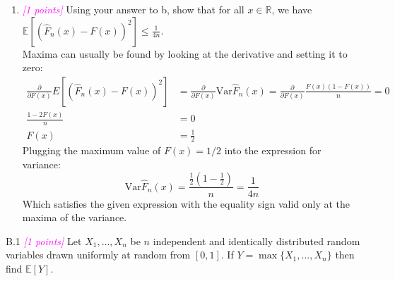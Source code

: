 \documentclass{article}
\newcommand{\field}[1]{\mathbb{#1}}
\newcommand{\1}{\mathbf{1}}
\newcommand{\E}{\mathbb{E}}
\newcommand{\R}{\field{R}} %
\newcommand{\points}[1]{\small\textcolor{magenta}{\emph{[#1 points]}} \normalsize}
\begin{document}
\begin{enumerate}
  \item \points{1} Using your answer to b, show that
    for all $x\in \R$, we have  $\displaystyle \E[ ( \widehat{F}_n(x) - F(x) )^2 ] \leq \tfrac{1}{4n}$.\\
    Maxima can usually be found by looking at the derivative and setting it to zero:
    \begin{align*}
         \frac{\partial}{\partial F(x)} E[ ( \widehat{F}_n(x) - F(x) )^2 ] &= \frac{\partial}{\partial F(x)} \text{Var} \widehat{F}_n(x) = \frac{\partial}{\partial F(x)} \frac{F(x)\left(1-F(x)\right)}{n} = 0 \\
          \frac{1 - 2F(x)}{n} &= 0 \\
          F(x) &= \frac{1}{2}
    \end{align*} 
    Plugging the maximum value of $F(x)=1/2$ into the expression for variance:
    $$\text{Var} \widehat{F}_n(x) = \frac{\frac{1}{2}\left(1-\frac{1}{2}\right)}{n} = \frac{1}{4n} $$
    Which satisfies the given expression with the equality sign valid only at the maxima of the variance. 
    \end{enumerate}

\newpage
B.1  \points{1} Let $X_1,\dots,X_n$ be $n$ independent and identically distributed random variables drawn uniformly at random from $[0,1]$. If $Y = \max\{X_1,\dots,X_n\}$ then find $\E[Y]$.\\

\newpage
\end{document}
